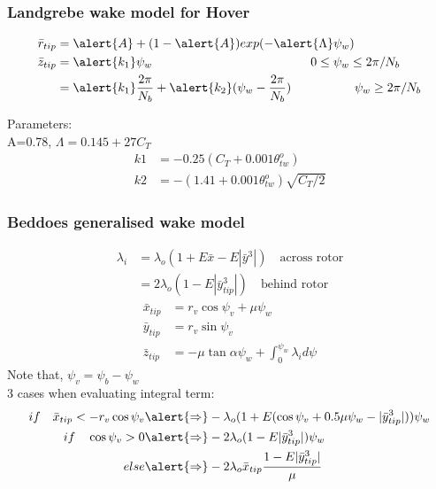 \documentclass[11pt]{beamer}
\begin{document}
\begin{frame}[t]
\frametitle{Landgrebe wake model for Hover}
\begin{align}
	\bar{r}_{tip} &=\alert{A}+(1-\alert{A})exp(-\alert{\Lambda} \psi_w)\\
	\bar{z}_{tip} &=\alert{k_1}\psi_w \hspace{4.5cm} 0\le\psi_w\le 2\pi/N_b\\
	       &=\alert{k_1}\frac{2\pi}{N_b}+\alert{k_2}(\psi_w-\frac{2\pi}{N_b}) \hspace{1.8cm} \psi_w\ge 2\pi/N_b
\end{align}

\vspace{0.5cm}
Parameters:\\
A=0.78, $\Lambda=0.145+27C_T$
\begin{align*}
	k1 &= -0.25(C_T+0.001\theta_{tw}^o)\\
    k2 &= -(1.41+0.001\theta_{tw}^o)\sqrt{C_T/2}
\end{align*}
\end{frame}

\begin{frame}[t]
\frametitle{Beddoes generalised wake model}
	\begin{align}
		\lambda_i&=\lambda_o(1+E\bar{x}-E|\bar{y}^3|)  \quad \text{across rotor}\\
		&=2\lambda_o(1-E|\bar{y}_{tip}^3|)  \quad \text{behind rotor}
	\end{align}
	\begin{align}
		\bar{x}_{tip}&=r_v\cos\psi_v+\mu\psi_w\\
		\bar{y}_{tip}&=r_v\sin\psi_v\\
		\bar{z}_{tip}&=-\mu\tan\alpha\psi_w+\int_{0}^{\psi_w}\lambda_id\psi
	\end{align}
	{\small Note that, $\psi_v=\psi_b-\psi_w$}\\
	3 cases when evaluating integral term:\\
	\vspace{-0.5cm}
\begin{align*}
if \quad \bar{x}_{tip}<-r_v\cos\psi_v&\alert{\Rightarrow}-\lambda_o(1+E(\cos\psi_v+0.5\mu\psi_w-|\bar{y}_{tip}^3|))\psi_w\\
if \quad \cos\psi_v>0&\alert{\Rightarrow}-2\lambda_o(1-E|\bar{y}_{tip}^3|)\psi_w\\
else &\alert{\Rightarrow}-2\lambda_o\bar{x}_{tip}\frac{1-E|\bar{y}_{tip}^3|}{\mu}
\end{align*}
\end{frame}
\end{document}
